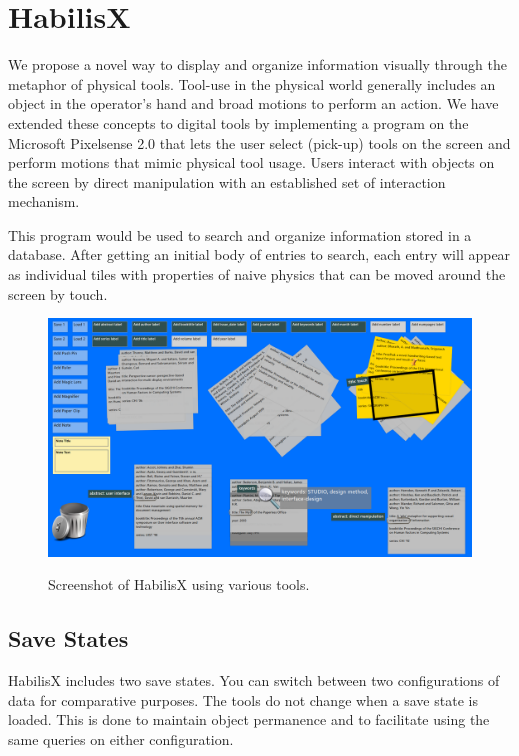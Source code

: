 \documentclass{article}
\begin{document}
\section{HabilisX}

We propose a novel way to display and organize information visually through the metaphor of physical tools. Tool-use in the physical world generally includes an object in the operator's hand and broad motions to perform an action. We have extended these concepts to digital tools by implementing a program on the Microsoft Pixelsense 2.0 that lets the user select (pick-up) tools on the screen and perform motions that mimic physical tool usage. Users interact with objects on the screen by direct manipulation with an established set of interaction mechanism.  

This program would be used to search and organize information stored in a database.  After getting an initial body of entries to search, each entry will appear as individual tiles with properties of naive physics that can be moved around the screen by touch. 


\begin{figure}[t!]
\centering
\scalebox{.239}
{\includegraphics{HabilisScreenShot.png}}
\caption{Screenshot of HabilisX using various tools.}
\label{Fig:screenshot}
\end{figure}


\subsection{Save States}
HabilisX includes two save states.  You can switch between two configurations of data for comparative purposes.  The tools do not change when a save state is loaded.  This is done to maintain object permanence and to facilitate using the same queries on either configuration.  
\end{document}
